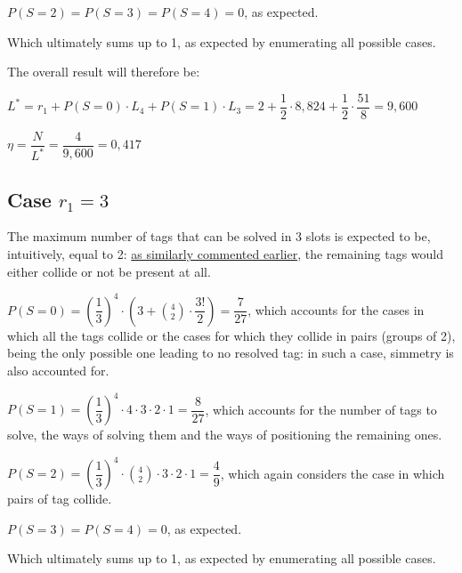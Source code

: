 \documentclass[a4paper,11pt]{article} %
\begin{document}
\medskip

$P(S = 2) = P(S = 3) = P(S = 4) = 0$, as expected.

\medskip

Which ultimately sums up to 1, as expected by enumerating all possible cases.

\bigskip

The overall result will therefore be:

\medskip

$L^{*} = r_1 + P(S = 0) \cdot L_4 + P(S = 1) \cdot L_3 = 2 + \dfrac{1}{2} \cdot 8,824 + \dfrac{1}{2} \cdot \dfrac{51}{8} = 9,600$

\medskip

$\eta = \dfrac{N}{L^{*}} = \dfrac{4}{9,600} = 0,417$

\subsection{Case $r_1 = 3$}

The maximum number of tags that can be solved in 3 slots is expected to be, intuitively, equal to 2: \hyperref[computation-L4]{as similarly commented earlier}, the remaining tags would either collide or not be present at all.

\medskip

$P(S = 0) = \left(\dfrac{1}{3}\right)^4 \cdot \left(3 + \displaystyle\binom{4}{2} \cdot \dfrac{3!}{2}\right) = \dfrac{7}{27}$, which accounts for the cases in which all the tags collide or the cases for which they collide in pairs (groups of 2), being the only possible one leading to no resolved tag: in such a case, simmetry is also accounted for.

\medskip

$P(S = 1) = \left(\dfrac{1}{3}\right)^4 \cdot 4 \cdot 3 \cdot 2 \cdot 1 = \dfrac{8}{27}$, which accounts for the number of tags to solve, the ways of solving them and the ways of positioning the remaining ones.

\medskip

$P(S = 2) = \left(\dfrac{1}{3}\right)^4 \cdot \displaystyle\binom{4}{2} \cdot 3 \cdot 2 \cdot 1 = \dfrac{4}{9}$, which again considers the case in which pairs of tag collide.

\medskip

$P(S = 3) = P(S = 4) = 0$, as expected.

\medskip

Which ultimately sums up to 1, as expected by enumerating all possible cases.
\end{document}

